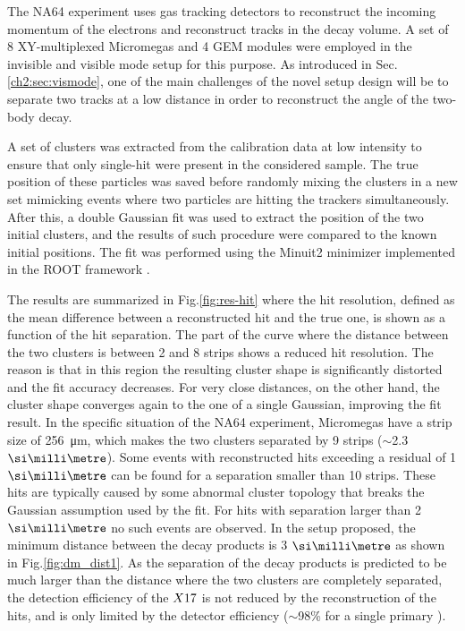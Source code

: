 The NA64 experiment uses gas tracking detectors to reconstruct the incoming momentum of the electrons and reconstruct tracks in the decay volume. A set of 8 XY-multiplexed Micromegas and 4 GEM modules were employed in the invisible and visible mode setup for this purpose. As introduced in Sec.\ref{ch2:sec:vismode}, one of the main challenges of the novel setup design will be to separate two tracks at a low distance in order to reconstruct the angle of the two-body decay.

A set of clusters was extracted from the calibration data at low intensity to ensure that only single-hit were present in the considered sample. The true position of these particles was saved before randomly mixing the clusters in a new set mimicking events where two particles are hitting the trackers simultaneously. After this, a double Gaussian fit was used to extract the position of the two initial clusters, and the results of such procedure were compared to the known initial positions. The fit was performed using the Minuit2 minimizer implemented in the ROOT framework \cite{root}.

The results are summarized in Fig.\ref{fig:res-hit} where the hit resolution, defined as the mean difference between a reconstructed hit and the true one, is shown as a function of the hit separation. The part of the curve where the distance between the two clusters is between 2 and 8 strips shows a reduced hit resolution. The reason is that in this region the resulting cluster shape is significantly distorted and the fit accuracy decreases. For very close distances, on the other hand, the cluster shape converges again to the one of a single Gaussian, improving the fit result. In the specific situation of the NA64 experiment, Micromegas have a strip size of \SI{256}{\micro\meter}, which makes the two clusters separated by 9 strips ($\sim$2.3 $\mmi$). Some events with reconstructed hits exceeding a residual of 1 $\mmi$ can be found for a separation smaller than 10 strips. These hits are typically caused by some abnormal cluster topology that breaks the Gaussian assumption used by the fit. For hits with separation larger than 2 $\mmi$ no such events are observed. In the setup proposed, the minimum distance between the decay products is 3 $\mmi$ as shown in Fig.\ref{fig:dm_dist1}. As the separation of the decay products is predicted to be much larger than the distance where the two clusters are completely separated, the detection efficiency of the $X17$ is not reduced by the reconstruction of the hits, and is only limited by the detector efficiency ($\sim$98\% for a single primary \cite{Banerjee:2017mdu}).

